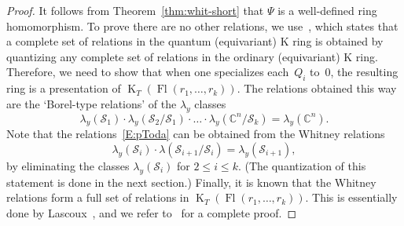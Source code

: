\documentclass[pdftex]{sigma}
\numberwithin{equation}{section}
\theoremstyle{definition}
\DeclareMathOperator{\Fl}{Fl}
\DeclareMathOperator{\K}{K}
\newcommand{\C}{{\mathbb C}}
\newcommand{\cS}{{\mathcal S}}
\begin{document}
\begin{proof}
It follows from Theorem~\ref{thm:whit-short} that $\Psi$ is a well-defined ring homomorphism.
To prove there are no other relations, we use~\cite[Theorem~4.1]{GMSXZZ:Nakayama}, which
states that a complete set of relations in the quantum (equivariant) K ring is
obtained by quantizing any complete set of relations in the ordinary (equivariant) K ring.
Therefore, we need to show that when one specializes each~$Q_i$ to~$0$, the resulting
ring is a presentation of $\K_T(\Fl(r_1,\dots,r_k))$.
The relations obtained this way
are the `Borel-type relations' of the $\lambda_y$ classes
\begin{equation}\label{E:pToda} \lambda_y(\cS_1) \cdot \lambda_y(\cS_2/\cS_1)\cdot \dots \cdot \lambda_y(\C^n/\cS_k) = \lambda_y(\C^n) . \end{equation}
Note that the relations~\eqref{E:pToda} can be obtained from the Whitney relations
\[ \lambda_y(\cS_i) \cdot \lambda(\cS_{i+1}/\cS_i) = \lambda_y(\cS_{i+1}) , \]
by eliminating the classes $\lambda_y(\cS_i)$ for $2 \le i \le k$.
(The quantization of this statement is done in the next section.)
Finally, it is known that
the Whitney relations form a full set of relations
in $\K_T(\Fl(r_1,\dots,r_k))$. This is essentially done by Lascoux~\cite[Section~7]{lascoux:anneau},
and we refer to~\cite[Proposition~5.1]{GMSXZZ:Nakayama} for a complete proof.
\end{proof}
\end{document}
